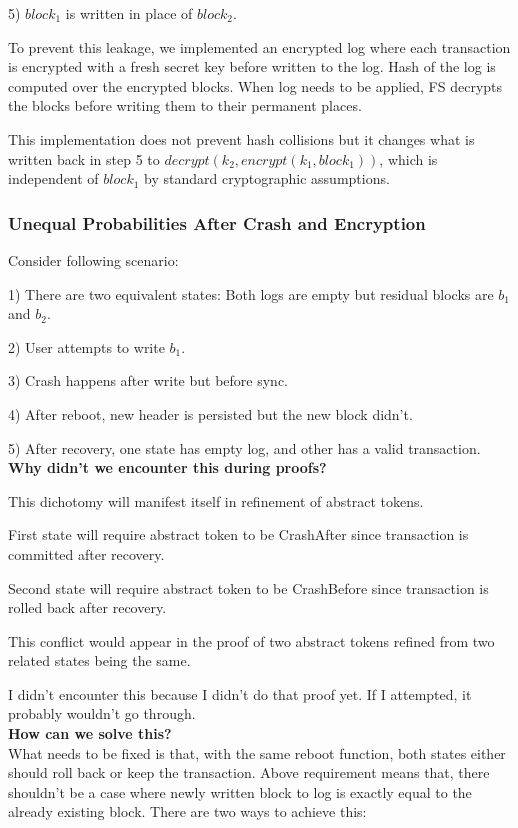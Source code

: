 \documentclass[onecolumn]{paper}
\begin{document}
		5) $block_1$ is written in place of $block_2$.
		
		To prevent this leakage, we implemented an encrypted log where each transaction is encrypted with a fresh secret key before written to the log.
		Hash of the log is computed over the encrypted blocks. When log needs to be applied, FS decrypts the blocks before writing them to their permanent places.
		
		This implementation does not prevent hash collisions but it changes what is written back in step 5 to $decrypt(k_2, encrypt(k_1, block_1))$, which is independent of $block_1$ by standard cryptographic assumptions.
		
		\subsubsection{Unequal Probabilities After Crash and Encryption}
		
		Consider following scenario:
		
		1) There are two equivalent states: Both logs are empty but residual blocks are $b_1$ and $b_2$.
		
		2) User attempts to write $b_1$.
		
		3) Crash happens after write but before sync.
		
		4) After reboot, new header is persisted but the new block didn't.
		
		5) After recovery, one state has empty log, and other has a valid transaction.\\
		
		{\bf Why didn't we encounter this during proofs?}
		
		This dichotomy will manifest itself in refinement of abstract tokens.
		
		First state will require abstract token to be CrashAfter since transaction is committed after recovery.
		
		Second state will require abstract token to be CrashBefore since transaction is rolled back after recovery.
		
		This conflict would appear in the proof of two abstract tokens refined from two related states being the same.
		
		I didn't encounter this because I didn't do that proof yet. If I attempted, it probably wouldn't go through.\\
		
		{\bf How can we solve this?}\\
		What needs to be fixed is that, with the same reboot function, both states either should roll back or keep the transaction.
		Above requirement means that, there shouldn't be a case where newly written block to log is exactly equal to the already existing block.
		There are two ways to achieve this:\\
		
\end{document}
